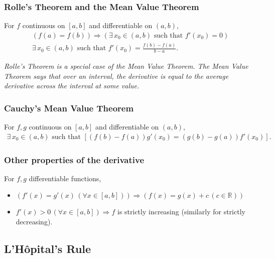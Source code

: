 \documentclass[a4paper, 12pt, twoside]{article}
\begin{document}
\subsubsection{Rolle's Theorem and the Mean Value Theorem}

For $f$ continuous on $[a, b]$ and differentiable on $(a, b)$,
\begin{align*}
      (f(a) = f(b)) \Rightarrow (\exists \, x_0 \in (a, b)
      \text{ such that } f'(x_0) = 0) \tag{Rolle's Theorem} \\
      \exists \, x_0 \in (a, b) \text{ such that } f'(x_0)
      = \frac{f(b) - f(a)}{b - a}. \tag{Mean Value Theorem}
\end{align*}

\textit{Rolle's Theorem is a special case of the Mean Value Theorem.
      The Mean Value Theorem says that over an interval, the derivative is
      equal to the average derivative across the interval at some value.}

\subsubsection{Cauchy's Mean Value Theorem}

For $f, g$ continuous on $[a, b]$ and differentiable on $(a, b)$,
\begin{align*}
      \exists \, x_0 \in (a, b) \text{ such that }
      \left[(f(b) - f(a))g'(x_0) = (g(b) - g(a))f'(x_0)\right].
\end{align*}

\subsubsection{Other properties of the derivative}

For $f, g$ differentiable functions,

\begin{itemize}
      \item $(f'(x) = g'(x) \, (\forall x \in [a, b])) \Rightarrow
                  (f(x) = g(x) + c \, (c \in \mathbb{R}))$
      \item $f'(x) > 0 \, (\forall x \in [a, b]) \Rightarrow f$ is
            strictly increasing (similarly for strictly decreasing).
\end{itemize}

\subsection{L'Hôpital's Rule}
\end{document}
